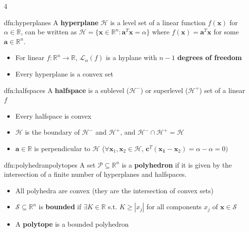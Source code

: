\documentclass[landscape, 8pt]{extarticle}
\begin{document}
\begin{multicols*}{4}
		
		\begin{dfn}[Hyperplanes]{dfn:hyperplanes}{ }
			A \textbf{hyperplane} $\mathcal{H}$ is a level set of a linear function $f(\mathbf{x})$ for $\alpha\in \mathbb{R}$, can be written as $\mathcal{H} = \{\mathbf{x}\in \mathbb{R}^n : \mathbf{a}^T\mathbf{x} = \alpha\}$ where $f(\mathbf{x}) = \mathbf{a}^T \mathbf{x}$ for some $\mathbf{a}\in \mathbb{R}^n$.
			\begin{itemize}
				\item For linear $f:\mathbb{R}^n \to \mathbb{R}$, $\mathcal{L}_\alpha(f)$ is a hyplane with $n-1$ \textbf{degrees of freedom}
				\item Every hyperplane is a convex set
			\end{itemize}
			
		\end{dfn}
		
		
		\begin{dfn}[Halfspaces]{dfn:halfspaces}{ }
			A \textbf{halfspace} is a sublevel ($\mathcal{H}^-$) or superlevel ($\mathcal{H}^+$) set of a linear $f$
			\begin{itemize}
				\item Every halfspace is convex
				\item $\mathcal{H}$ is the boundary of $\mathcal{H}^-$ and $\mathcal{H}^+$, and $\mathcal{H}^- \cap \mathcal{H}^+ = \mathcal{H}$
				\item $\mathbf{a}\in \mathbb{R}$ is perpendicular to $\mathcal{H}$ ($\forall \mathbf{x}_1, \mathbf{x}_2\in \mathcal{H}$, $\mathbf{c}^T(\mathbf{x_1} - \mathbf{x}_2) = \alpha - \alpha = 0)$
			\end{itemize}
			
		\end{dfn}
		
		
		\begin{dfn}{dfn:polyhedranpolytopes}{ }
			A set $\mathcal{P} \subseteq\mathbb{R}^n$ is a \textbf{polyhedron} if it is given by the intersection of a finite number of hyperplanes and halfspaces.
			\begin{itemize}
				\item All polyhedra are convex (they are the intersection of convex sets)
				\item $\mathcal{S} \subseteq \mathbb{R}^n$ is \textbf{bounded} if $\exists K\in \mathbb{R}$ s.t. $K \ge \left|x_j\right|$ for all components $x_j$ of $\mathbf{x}\in \mathcal{S}$
				\item A \textbf{polytope} is a bounded polyhedron
			\end{itemize}
			

\end{dfn}
\end{multicols*}
\end{document}
